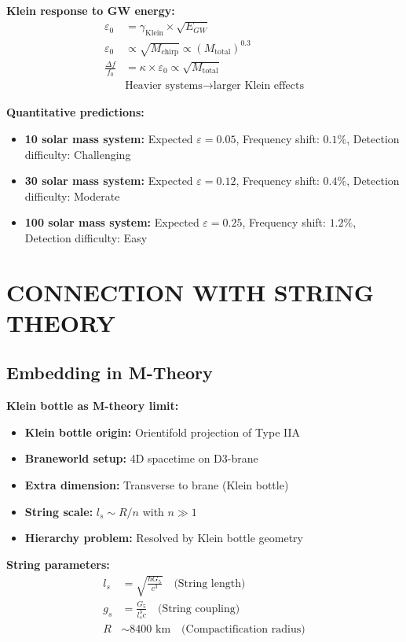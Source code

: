 \documentclass[12pt,a4paper]{article}
\begin{document}
\textbf{Klein response to GW energy:}
\begin{align}
\varepsilon_0 &= \gamma_{\text{Klein}} \times \sqrt{E_{GW}}\\
\varepsilon_0 &\propto \sqrt{M_{\text{chirp}}} \propto (M_{\text{total}})^{0.3}\\
\frac{\Delta f}{f_0} &= \kappa \times \varepsilon_0 \propto \sqrt{M_{\text{total}}}\\
&\text{Heavier systems} \rightarrow \text{larger Klein effects}
\end{align}

\textbf{Quantitative predictions:}

\begin{itemize}
\item \textbf{10 solar mass system:} Expected $\varepsilon = 0.05$, Frequency shift: $0.1\%$, Detection difficulty: Challenging
\item \textbf{30 solar mass system:} Expected $\varepsilon = 0.12$, Frequency shift: $0.4\%$, Detection difficulty: Moderate
\item \textbf{100 solar mass system:} Expected $\varepsilon = 0.25$, Frequency shift: $1.2\%$, Detection difficulty: Easy
\end{itemize}

\section{CONNECTION WITH STRING THEORY}

\subsection{Embedding in M-Theory}

\textbf{Klein bottle as M-theory limit:}
\begin{itemize}
\item \textbf{Klein bottle origin:} Orientifold projection of Type IIA
\item \textbf{Braneworld setup:} 4D spacetime on D3-brane
\item \textbf{Extra dimension:} Transverse to brane (Klein bottle)
\item \textbf{String scale:} $l_s \sim R/n$ with $n \gg 1$
\item \textbf{Hierarchy problem:} Resolved by Klein bottle geometry
\end{itemize}

\textbf{String parameters:}
\begin{align}
l_s &= \sqrt{\frac{\hbar G_5}{c^3}} \quad \text{(String length)}\\
g_s &= \frac{G_5}{l_s^3 c} \quad \text{(String coupling)}\\
R &\sim 8400 \text{ km} \quad \text{(Compactification radius)}
\end{align}
\end{document}
